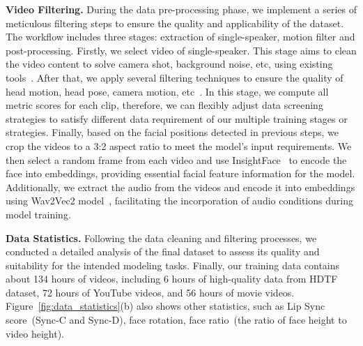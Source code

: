 
    
    



\noindent\textbf{Video Filtering.}
During the data pre-processing phase, we implement a series of meticulous filtering steps to ensure the quality and applicability of the dataset. The workflow includes three stages: extraction of single-speaker, motion filter and post-processing. Firstly, we select video of single-speaker. This stage aims to clean the video content to solve camera shot, background noise, etc, using existing tools~\cite{Plaquet23,Bredin23}. After that, we apply several filtering techniques to ensure the quality of head motion, head pose, camera motion, etc~\cite{karaev23cotracker,karaev24cotracker3,Chung16a}. In this stage, we compute all metric scores for each clip, therefore, we can flexibly adjust data screening strategies to satisfy different data requirement of our multiple training stages or strategies. Finally, based on the facial positions detected in previous steps, we crop the videos to a 3:2 aspect ratio to meet the model's input requirements. We then select a random frame from each video and use InsightFace~\cite{ren2023pbidr} to encode the face into embeddings, providing essential facial feature information for the model. Additionally, we extract the audio from the videos and encode it into embeddings using Wav2Vec2 model~\cite{baevski2020wav2vec}, facilitating the incorporation of audio conditions during model training.

\noindent\textbf{Data Statistics.}
Following the data cleaning and filtering processes, we conducted a detailed analysis of the final dataset to assess its quality and suitability for the intended modeling tasks. Finally, our training data contains about 134 hours of videos, including 6 hours of high-quality data from HDTF dataset, 72 hours of YouTube videos, and 56 hours of movie videos. Figure~\ref{fig:data_statistics}(b) also shows other statistics, such as Lip Sync score~(Sync-C and Sync-D), face rotation, face ratio~(the ratio of face height to video height).



